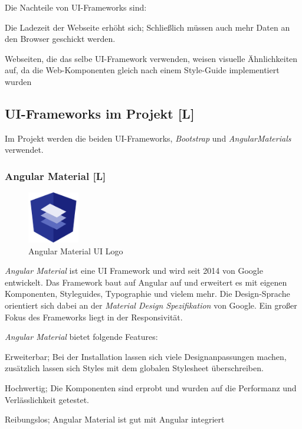 Die Nachteile von UI-Frameworks sind: 
\begin{compactitem}
    \item Die Ladezeit der Webseite erhöht sich;
    Schließlich müssen auch mehr Daten an den Browser geschickt werden.
    \item Webseiten, die das selbe UI-Framework verwenden, weisen visuelle Ähnlichkeiten auf, da die Web-Komponenten gleich nach einem Style-Guide implementiert wurden
\end{compactitem}


\subsection{UI-Frameworks im Projekt [L]}
Im Projekt werden die beiden UI-Frameworks, \emph{Bootstrap} und \emph{AngularMaterials} verwendet.


\subsubsection{Angular Material [L]}
\begin{figure}
  \begin{center}
    \includegraphics[width=0.2\textwidth]{pics/Angular_Material_UI_Logo.png}
   \caption{Angular Material UI Logo}
  \end{center}
\end{figure}
\emph{Angular Material} ist eine UI Framework und wird seit 2014 von Google entwickelt. Das Framework baut auf Angular auf und erweitert es mit eigenen Komponenten, Styleguides, Typographie und vielem mehr. Die Design-Sprache orientiert sich dabei an der \emph{Material Design Spezifikation} von Google. Ein großer Fokus des Frameworks liegt in der Responsivität. \cite{JavaPointAngularMaterial, WhatAngularMaterial}


\emph{Angular Material} bietet folgende Features: \cite{JavaPointAngularMaterial, WhatAngularMaterial}
\begin{compactitem}
    \item Erweiterbar; Bei der Installation lassen sich viele Designanpassungen machen, zusätzlich lassen sich Styles mit dem globalen Stylesheet überschreiben. 
    \item Hochwertig; Die Komponenten sind erprobt und wurden auf die Performanz und Verlässlichkeit getestet.
    \item Reibungslos; Angular Material ist gut mit Angular integriert
\end{compactitem}

